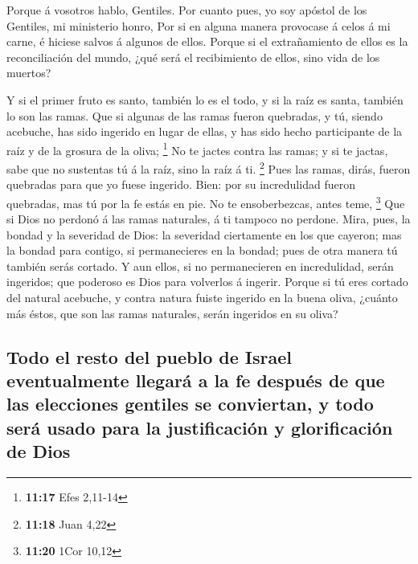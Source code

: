  Porque á vosotros hablo, Gentiles. Por cuanto pues, yo
soy apóstol de los Gentiles, mi ministerio honro,  Por si
en alguna manera provocase á celos á mi carne, é hiciese salvos á
algunos de ellos.  Porque si el extrañamiento de ellos es
la reconciliación del mundo, ¿qué será el recibimiento de ellos, sino
vida de los muertos?

 Y si el primer fruto es santo, también lo es el todo, y
si la raíz es santa, también lo son las ramas.  Que si
algunas de las ramas fueron quebradas, y tú, siendo acebuche, has sido
ingerido en lugar de ellas, y has sido hecho participante de la raíz y
de la grosura de la oliva; \footnote{\textbf{11:17} Efes 2,11-14}
 No te jactes contra las ramas; y si te jactas, sabe que
no sustentas tú á la raíz, sino la raíz á ti. \footnote{\textbf{11:18}
  Juan 4,22}  Pues las ramas, dirás, fueron quebradas
para que yo fuese ingerido.  Bien: por su incredulidad
fueron quebradas, mas tú por la fe estás en pie. No te ensoberbezcas,
antes teme, \footnote{\textbf{11:20} 1Cor 10,12}  Que si
Dios no perdonó á las ramas naturales, á ti tampoco no perdone.
 Mira, pues, la bondad y la severidad de Dios: la
severidad ciertamente en los que cayeron; mas la bondad para contigo, si
permanecieres en la bondad; pues de otra manera tú también serás
cortado.  Y aun ellos, si no permanecieren en
incredulidad, serán ingeridos; que poderoso es Dios para volverlos á
ingerir.  Porque si tú eres cortado del natural acebuche,
y contra natura fuiste ingerido en la buena oliva, ¿cuánto más éstos,
que son las ramas naturales, serán ingeridos en su oliva?

\hypertarget{todo-el-resto-del-pueblo-de-israel-eventualmente-llegaruxe1-a-la-fe-despuuxe9s-de-que-las-elecciones-gentiles-se-conviertan-y-todo-seruxe1-usado-para-la-justificaciuxf3n-y-glorificaciuxf3n-de-dios}{%
\subsection{Todo el resto del pueblo de Israel eventualmente llegará a
la fe después de que las elecciones gentiles se conviertan, y todo será
usado para la justificación y glorificación de
Dios}\label{todo-el-resto-del-pueblo-de-israel-eventualmente-llegaruxe1-a-la-fe-despuuxe9s-de-que-las-elecciones-gentiles-se-conviertan-y-todo-seruxe1-usado-para-la-justificaciuxf3n-y-glorificaciuxf3n-de-dios}}

